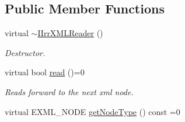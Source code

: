 \subsection*{Public Member Functions}
\begin{DoxyCompactItemize}
\item 
\hypertarget{classirr_1_1io_1_1_i_irr_x_m_l_reader_ad1d9faeae926afc224d9dea0ad7a08ac}{virtual \hyperlink{classirr_1_1io_1_1_i_irr_x_m_l_reader_ad1d9faeae926afc224d9dea0ad7a08ac}{$\sim$\+I\+Irr\+X\+M\+L\+Reader} ()}\label{classirr_1_1io_1_1_i_irr_x_m_l_reader_ad1d9faeae926afc224d9dea0ad7a08ac}

\begin{DoxyCompactList}\small\item\em Destructor. \end{DoxyCompactList}\item 
virtual bool \hyperlink{classirr_1_1io_1_1_i_irr_x_m_l_reader_a157f458f7dabeeff173f72a0fb443a8e}{read} ()=0
\begin{DoxyCompactList}\small\item\em Reads forward to the next xml node. \end{DoxyCompactList}\item 
\hypertarget{classirr_1_1io_1_1_i_irr_x_m_l_reader_a3482e8e6bdc15965fc6a0bcef6e9a8e0}{virtual E\+X\+M\+L\+\_\+\+N\+O\+D\+E \hyperlink{classirr_1_1io_1_1_i_irr_x_m_l_reader_a3482e8e6bdc15965fc6a0bcef6e9a8e0}{get\+Node\+Type} () const =0}\label{classirr_1_1io_1_1_i_irr_x_m_l_reader_a3482e8e6bdc15965fc6a0bcef6e9a8e0}


\end{DoxyCompactItemize}
